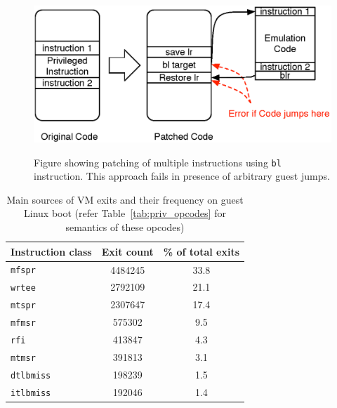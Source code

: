 \documentclass[10pt,twocolumn]{article}
\begin{document}
\begin{figure}[!htb]
\centering
\includegraphics[scale=0.5]{multiple_ins_patching.eps}
\label{fig:multiple_insns_patching}
\caption{Figure showing patching of multiple instructions using {\tt bl} instruction. This approach fails in presence of arbitrary guest jumps.}
\end{figure}

\begin{table}[!b]
\centering
     \begin{tabular}{lcc} \hline
       Instruction class  & Exit count & \% of total exits  \\ \hline
       {\tt mfspr} & 4484245 & 33.8  \\
       {\tt wrtee} & 2792109 & 21.1  \\
       {\tt mtspr} & 2307647 & 17.4  \\
       {\tt mfmsr} & 575302 & 9.5 \\
       {\tt rfi} & 413847 & 4.3 \\
       {\tt mtmsr} & 391813 & 3.1 \\
       {\tt dtlbmiss} & 198239 & 1.5 \\
       {\tt itlbmiss} & 192046 & 1.4 \\
       \hline
     \end{tabular}
\label{tab:linuxboot_exitcount}
\caption{Main sources of VM exits and their frequency on guest Linux boot (refer Table~\ref{tab:priv_opcodes} for semantics of these opcodes)}
\end{table}
\end{document}
